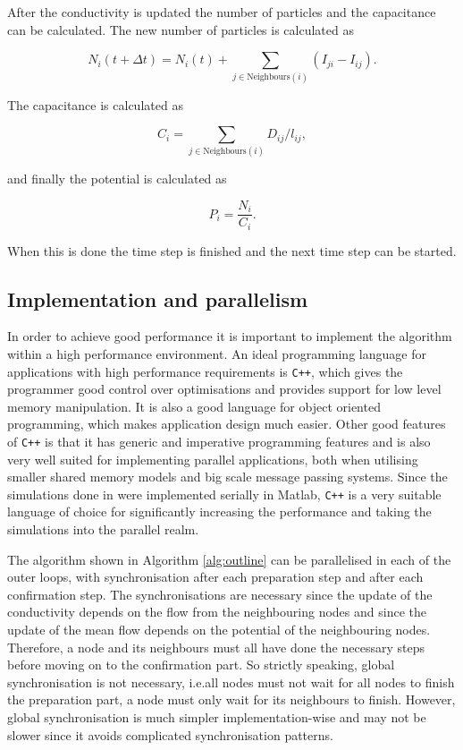 After the conductivity is updated the number of particles and the capacitance can be calculated. The new number of particles is calculated as

 \begin{equation}
 N_i(t + \Delta t) = N_i(t) + \sum_{j \in \text{Neighbours}(i)} \left( I_{ji} - I_{ij} \right).
 \end{equation}

 \noindent The capacitance is calculated as 

 \begin{equation}
 C_i = \sum_{j \in \text{Neighbours}(i)} D_{ij}/l_{ij},
 \end{equation}
 
 \noindent and finally the potential is calculated as
 
 \begin{equation}
 P_i = \frac{N_i}{C_i}.
 \end{equation}
 
 \noindent When this is done the time step is finished and the next time step can be started.

\subsection{Implementation and parallelism} 
\label{sec:parallel}
In order to achieve good performance it is important to implement the algorithm within a high performance environment. An ideal programming language for applications with high performance requirements is \texttt{C++}, which gives the programmer good control over optimisations and provides support for low level memory manipulation. It is also a good language for object oriented programming, which makes application design much easier. Other good features of \texttt{C++} is that it has generic and imperative programming features and is also very well suited for implementing parallel applications, both when utilising smaller shared memory models and big scale message passing systems. Since the simulations done in \cite{Sumpter} were implemented serially in Matlab, \texttt{C++} is a very suitable language of choice for significantly increasing the performance and taking the simulations into the parallel realm.

The algorithm shown in Algorithm \ref{alg:outline} can be parallelised in each of the outer loops, with synchronisation after each preparation step and after each confirmation step. The synchronisations are necessary since the update of the conductivity depends on the flow from the neighbouring nodes and since the update of the mean flow depends on the potential of the neighbouring nodes. Therefore, a node and its neighbours must all have done the necessary steps before moving on to the confirmation part. So strictly speaking, global synchronisation is not necessary, i.e.\@ all nodes must not wait for all nodes to finish the preparation part, a node must only wait for its neighbours to finish. However, global synchronisation is much simpler implementation-wise and may not be slower since it avoids complicated synchronisation patterns.

